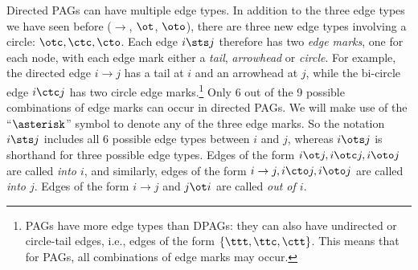 Directed PAGs can have multiple edge types. In addition to the three edge types we have seen before
($\to$, $\ot$, $\oto$), there are three new edge types involving a circle: $\otc,\ctc,\cto$.
Each edge $i \sts j$ therefore has two \emph{edge marks}, one for each node, with each edge mark
either a \emph{tail}, \emph{arrowhead} or \emph{circle}. For example, the directed edge $i \to j$ has a 
tail at $i$ and an arrowhead at $j$, while the bi-circle edge $i \ctc j$ has two circle edge marks.\footnote{PAGs have more edge types than DPAGs: they can also have 
undirected or circle-tail edges, i.e., edges of the form $\{\ttt,\ttc,\ctt\}$. This means that for PAGs,
all combinations of edge marks may occur.}
Only 6 out of the 9 possible combinations of edge marks can occur in directed PAGs. We will make use
of the ``$\asterisk$'' symbol to denote any of the three edge marks. So the notation $i \sts j$
includes all 6 possible edge types between $i$ and $j$, whereas $i \ots j$ is shorthand for three
possible edge types.
Edges of the form $i \ot j, i \otc j, i \oto j$ are called \emph{into $i$}, and similarly, edges of the form $i \to j, i \cto j, i \oto j$ are called \emph{into $j$}. Edges of the form $i \to j$ and $j \ot i$ are called \emph{out of $i$}.

